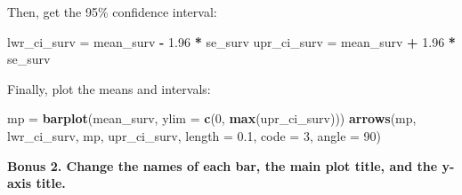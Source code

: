 \documentclass[]{book}
\newenvironment{Shaded}{\begin{snugshade}}{\end{snugshade}}
\newcommand{\DataTypeTok}[1]{\textcolor[rgb]{0.13,0.29,0.53}{#1}}
\newcommand{\DecValTok}[1]{\textcolor[rgb]{0.00,0.00,0.81}{#1}}
\newcommand{\FloatTok}[1]{\textcolor[rgb]{0.00,0.00,0.81}{#1}}
\newcommand{\KeywordTok}[1]{\textcolor[rgb]{0.13,0.29,0.53}{\textbf{#1}}}
\newcommand{\NormalTok}[1]{#1}
\newcommand{\OperatorTok}[1]{\textcolor[rgb]{0.81,0.36,0.00}{\textbf{#1}}}
\newcommand{\StringTok}[1]{\textcolor[rgb]{0.31,0.60,0.02}{#1}}
\begin{document}
\begin{Shaded}
\end{Shaded}

Then, get the 95\% confidence interval:

\begin{Shaded}
\begin{Highlighting}[]
\NormalTok{lwr_ci_surv =}\StringTok{ }\NormalTok{mean_surv }\OperatorTok{-}\StringTok{ }\FloatTok{1.96} \OperatorTok{*}\StringTok{ }\NormalTok{se_surv}
\NormalTok{upr_ci_surv =}\StringTok{ }\NormalTok{mean_surv }\OperatorTok{+}\StringTok{ }\FloatTok{1.96} \OperatorTok{*}\StringTok{ }\NormalTok{se_surv}
\end{Highlighting}
\end{Shaded}

Finally, plot the means and intervals:

\begin{Shaded}
\begin{Highlighting}[]
\NormalTok{mp =}\StringTok{ }\KeywordTok{barplot}\NormalTok{(mean_surv, }\DataTypeTok{ylim =} \KeywordTok{c}\NormalTok{(}\DecValTok{0}\NormalTok{, }\KeywordTok{max}\NormalTok{(upr_ci_surv)))}
\KeywordTok{arrows}\NormalTok{(mp, lwr_ci_surv, mp, upr_ci_surv, }\DataTypeTok{length =} \FloatTok{0.1}\NormalTok{, }\DataTypeTok{code =} \DecValTok{3}\NormalTok{, }\DataTypeTok{angle =} \DecValTok{90}\NormalTok{)}
\end{Highlighting}
\end{Shaded}

\textbf{Bonus 2. Change the names of each bar, the main plot title, and the y-axis title. }

\begin{Shaded}
\end{Shaded}
\end{document}
